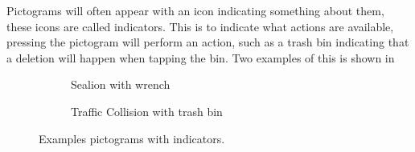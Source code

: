 Pictograms will often appear with an icon indicating something about them, these icons are called indicators. 
This is to indicate what actions are available, pressing the pictogram will perform an action, such as a trash bin indicating that a deletion will happen when tapping the bin. 
Two examples of this is shown in~

\begin{figure}[H]
    \centering
    \begin{subfigure}[b]{0.2\textwidth}
        \caption{Sealion with wrench}
        \label{fig:sealion}
    \end{subfigure}
    \qquad 
    \begin{subfigure}[b]{0.2\textwidth}
        \caption{Traffic Collision with trash bin}
        \label{fig:trafficcollision}
    \end{subfigure}
    \caption{Examples pictograms with indicators.}\label{fig:pictograms_with_indicators}
\end{figure}